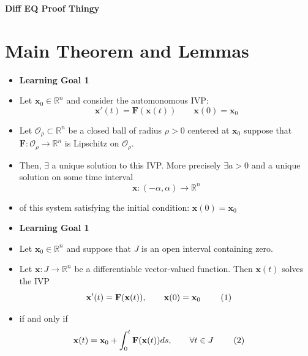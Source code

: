\documentclass[12pt]{article}
\newenvironment{AndreaBox}[1]{
\begin{tcolorbox}[
    title=#1,
    colback=white,
    colframe=Blue,
    coltitle=white,
    fonttitle=\bfseries,
    colback=white,
    rounded corners,
    boxrule=0.5pt,
    top=1mm, bottom=1mm, left=4mm, right=-2mm, %
    rounded corners,
    boxrule=0.5pt,
] \raggedright
}{\end{tcolorbox}}
\begin{document}
\begin{center}
    \Large \textbf{Diff EQ Proof Thingy} \\
    \vspace{0.2cm}
\end{center}

\section*{Main Theorem and Lemmas}
\begin{AndreaBox}{Main Theorem}
    \begin{itemize}[label={}, leftmargin=1mm, nosep]
        \item {\color{RoyalBlue}\textbf{Learning Goal 1}}
        \item Let $\mathbf{x}_0 \in \mathbb{R}^n$ and consider the automonomous IVP:
        \[\mathbf{x}'(t) = \mathbf{F}(\mathbf{x}(t)) \quad \quad \mathbf{x}(0) = \mathbf{x}_0\]
        \item Let $\mathcal{O}_\rho \subset \mathbb{R}^n$ be a closed ball of radius $\rho > 0$ centered at $\mathbf{x}_0$ suppose that $\mathbf{F}: \mathcal{O}_\rho \rightarrow \mathbb{R}^n$ is Lipschitz on $\mathcal{O}_\rho$.
        \item Then, $\exists$ a unique solution to this IVP. More precisely $\exists a>0$ and a unique solution on some time interval
        $$ \mathbf{x}: (-\alpha,\alpha) \rightarrow \mathbb{R}^n$$
        \item of this system satisfying the initial condition: $\mathbf{x}(0)=\mathbf{x}_0$
    \end{itemize}
\end{AndreaBox}

\begin{AndreaBox}{Lemma 1:}
    \begin{itemize}[label={}, leftmargin=1mm, nosep]
        \item {\color{RoyalBlue}\textbf{Learning Goal 1}}
        \item Let $\mathbf{x}_0 \in \mathbb{R}^n$ and suppose that $J$ is an open interval containing zero.
        \item Let $\mathbf{x}:J \rightarrow \mathbb{R}^n$ be a differentiable vector-valued function. Then $\mathbf{x}(t)$ solves the IVP
        \[\mathbf{x}'(t) = \mathbf{F}(\mathbf{x}(t)), \quad \quad \mathbf{x}(0)=\mathbf{x}_0 \tag*{ (1)\makebox[0.5cm]{} }\]
        \item if and only if
        \[\mathbf{x}(t) = \mathbf{x}_0 + \int_{0}^{t} {\mathbf{F}(\mathbf{x}(t))} ds, \quad \quad \forall t \in J \tag*{ (2)\makebox[0.5cm]{} }\]
        

    \end{itemize}
\end{AndreaBox}
\end{document}
